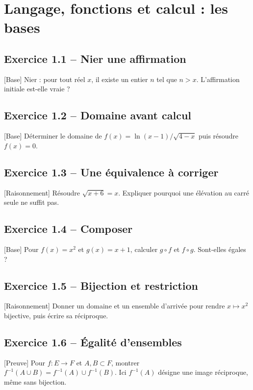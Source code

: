 \chapter{Langage, fonctions et calcul : les bases}
\section*{Exercice 1.1 -- Nier une affirmation}
[Base] Nier : pour tout réel $x$, il existe un entier $n$ tel que $n>x$. L'affirmation initiale est-elle vraie ?

\section*{Exercice 1.2 -- Domaine avant calcul}
[Base] Déterminer le domaine de $f(x)=\ln(x-1)/\sqrt{4-x}$ puis résoudre $f(x)=0$.

\section*{Exercice 1.3 -- Une équivalence à corriger}
[Raisonnement] Résoudre $\sqrt{x+6}=x$. Expliquer pourquoi une élévation au carré seule ne suffit pas.

\section*{Exercice 1.4 -- Composer}
[Base] Pour $f(x)=x^2$ et $g(x)=x+1$, calculer $g\circ f$ et $f\circ g$. Sont-elles égales ?

\section*{Exercice 1.5 -- Bijection et restriction}
[Raisonnement] Donner un domaine et un ensemble d'arrivée pour rendre $x\mapsto x^2$ bijective, puis écrire sa réciproque.

\section*{Exercice 1.6 -- Égalité d’ensembles}
[Preuve] Pour $f:E\to F$ et $A,B\subset F$, montrer $f^{-1}(A\cup B)=f^{-1}(A)\cup f^{-1}(B)$. Ici $f^{-1}(A)$ désigne une image réciproque, même sans bijection.

